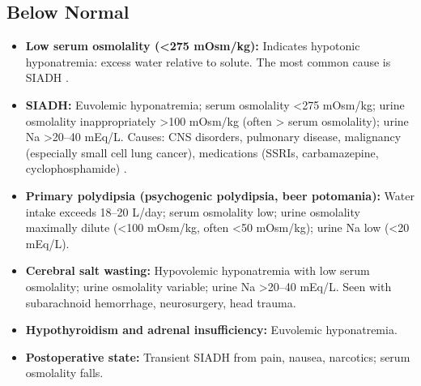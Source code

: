 \subsection*{Below Normal}
\begin{itemize}
  \item \textbf{Low serum osmolality (<275 mOsm/kg):} Indicates hypotonic hyponatremia: excess water relative to solute. The most common cause is SIADH \cite{sterns2015disorders}.
  \item \textbf{SIADH:} Euvolemic hyponatremia; serum osmolality <275 mOsm/kg; urine osmolality inappropriately >100 mOsm/kg (often > serum osmolality); urine Na >20--40 mEq/L. Causes: CNS disorders, pulmonary disease, malignancy (especially small cell lung cancer), medications (SSRIs, carbamazepine, cyclophosphamide) \cite{verbalis2013diagnosis}.
  \item \textbf{Primary polydipsia (psychogenic polydipsia, beer potomania):} Water intake exceeds 18--20 L/day; serum osmolality low; urine osmolality maximally dilute (<100 mOsm/kg, often <50 mOsm/kg); urine Na low (<20 mEq/L).
  \item \textbf{Cerebral salt wasting:} Hypovolemic hyponatremia with low serum osmolality; urine osmolality variable; urine Na >20--40 mEq/L. Seen with subarachnoid hemorrhage, neurosurgery, head trauma.
  \item \textbf{Hypothyroidism and adrenal insufficiency:} Euvolemic hyponatremia.
  \item \textbf{Postoperative state:} Transient SIADH from pain, nausea, narcotics; serum osmolality falls.
\end{itemize}

